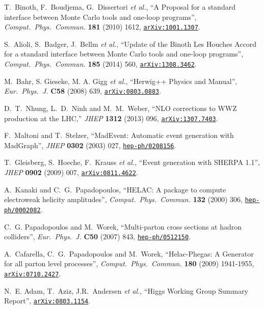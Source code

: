 \documentclass[english,12pt]{article}
\begin{document}
\begin{thebibliography}{10}
  T.~Binoth, F.~Boudjema, G.~Dissertori {\it et al.},
  ``{A Proposal for a standard interface between Monte Carlo tools and one-loop programs}'',
  {\em Comput.\ Phys.\ Commun.}  {\bf 181} (2010) 1612,
  \href{http://arxiv.org/abs/1001.1307}{{\tt arXiv:1001.1307}}.

  S.~Alioli, S.~Badger, J.~Bellm {\it et al.},
  ``{Update of the Binoth Les Houches Accord for a standard interface between Monte Carlo tools and one-loop programs}'',
  {\em Comput.\ Phys.\ Commun.}  {\bf 185} (2014) 560,
  \href{http://arxiv.org/abs/1308.3462}{{\tt arXiv:1308.3462}}.

M.~Bahr, S. Gieseke, M. A. Gigg {\it et al.}, ``{Herwig++ Physics and Manual}'', {\em Eur.\ Phys.\ J.} 
{\bf C58} (2008) 639, 
\href{http://www.arXiv.org/abs/0803.0883}{{\tt arXiv:0803.0883}}.

  D.~T.~Nhung, L.~D.~Ninh and M.~M.~Weber,
  ``NLO corrections to WWZ production at the LHC,''
  {\em JHEP } {\bf 1312} (2013) 096,
\href{http://www.arXiv.org/abs/1307.7403}{{\tt arXiv:1307.7403}}.

F.~Maltoni and T.~Stelzer, ``{MadEvent: Automatic event generation with
  MadGraph}'', {\em JHEP} {\bf 0302} (2003) 027,
\href{http://www.arXiv.org/abs/hep-ph/0208156}{{\tt hep-ph/0208156}}.

  T.~Gleisberg, S.~Hoeche, F.~Krauss {\it et al.},
  ``{Event generation with SHERPA 1.1}'',
  {\em JHEP} {\bf 0902} (2009)  007,
\href{http://www.arXiv.org/abs/0811.4622}{{\tt arXiv:0811.4622}}.

A.~Kanaki and C.~G.~Papadopoulos, 
``{HELAC: A package to compute electroweak helicity amplitudes}'',
{\em Comput.\ Phys.\ Commun.} {\bf 132} (2000) 306,
\href{http://www.arXiv.org/abs/hep-ph/0002082}{{\tt hep-ph/0002082}}.

C.~G. Papadopoulos and M.~Worek, ``{Multi-parton cross sections at hadron
  colliders}'', {\em Eur.\ Phys.\ J.} {\bf C50} (2007) 843,
\href{http://www.arXiv.org/abs/hep-ph/0512150}{{\tt hep-ph/0512150}}.

  A.~Cafarella, C.~G.~Papadopoulos and M.~Worek,
  ``{Helac-Phegas: A Generator for all parton level processes}'',
  {\em Comput.\ Phys.\ Commun.}  {\bf 180} (2009)  1941-1955,
 \href{http://arxiv.org/abs/0710.2427} {{\tt arXiv:0710.2427}}.

N.~E. Adam, T.~Aziz, J.R.~Andersen {\em et al.}, ``{Higgs Working Group Summary Report}'',
\href{http://www.arXiv.org/abs/0803.1154}{{\tt arXiv:0803.1154}}.


\end{thebibliography}
\end{document}
